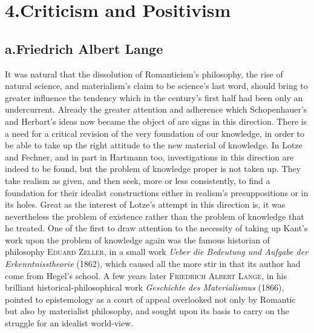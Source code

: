 \documentclass[12pt,a4paper]{book}
\newcommand{\opage}[1]{\marginnote{\footnotesize\textit{[#1]}}}
\begin{document}
\section*{4.\quad Criticism and Positivism}
\label{sec:kriticisme}

\subsection*{a.\quad Friedrich Albert Lange}

It was natural that the dissolution of Romanticism's philosophy, the rise of
natural science, and materialism's claim to be science's last word, should bring
to greater influence the tendency which in the century's first half had been only
an undercurrent. Already the greater attention and adherence which Schopenhauer's
and Herbart's ideas now became the object of are signs in this direction. There is
a need for a critical revision of the very foundation of our knowledge, in order
to be able to take up the right attitude to the new \opage{544}material of knowledge. In
Lotze and Fechner, and in part in Hartmann too, investigations in this direction
are indeed to be found, but the problem of knowledge proper is not taken up. They
take realism as given, and then seek, more or less consistently, to find a
foundation for their idealist constructions either in realism's presuppositions
or in its holes. Great as the interest of Lotze's attempt in this direction is,
it was nevertheless the problem of existence rather than the problem of knowledge
that he treated. One of the first to draw attention to the necessity of taking up
Kant's work upon the problem of knowledge again was the famous historian of
philosophy \textsc{Eduard Zeller}, in a small work \textit{Ueber die Bedeutung
und Aufgabe der Erkenntnisstheorie} (1862), which caused all the more stir in
that its author had come from Hegel's school. A few years later
\textsc{Friedrich Albert Lange}, in his brilliant historical-philosophical work
\textit{Geschichte des Materialismus} (1866), pointed to epistemology as a court
of appeal overlooked not only by Romantic but also by materialist philosophy, and
sought upon its basis to carry on the struggle for an idealist world-view.
\end{document}
